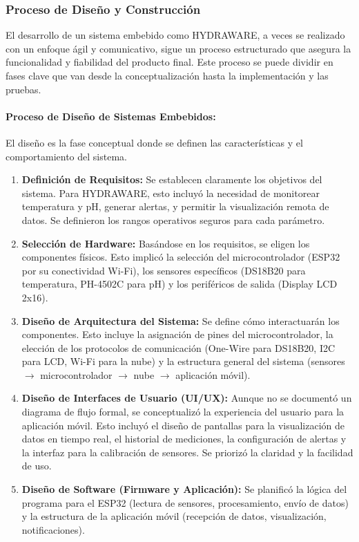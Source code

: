 \documentclass[a4paper,12pt]{article}
\begin{document}
	\subsubsection{Proceso de Diseño y Construcción}
	El desarrollo de un sistema embebido como HYDRAWARE, a veces se realizado con un enfoque ágil y comunicativo, sigue un proceso estructurado que asegura la funcionalidad y fiabilidad del producto final. Este proceso se puede dividir en fases clave que van desde la conceptualización hasta la implementación y las pruebas.
	
	\paragraph{Proceso de Diseño de Sistemas Embebidos:}
	El diseño es la fase conceptual donde se definen las características y el comportamiento del sistema.
	\begin{enumerate}
		\item \textbf{Definición de Requisitos:} Se establecen claramente los objetivos del sistema. Para HYDRAWARE, esto incluyó la necesidad de monitorear temperatura y pH, generar alertas, y permitir la visualización remota de datos. Se definieron los rangos operativos seguros para cada parámetro.
		\item \textbf{Selección de Hardware:} Basándose en los requisitos, se eligen los componentes físicos. Esto implicó la selección del microcontrolador (ESP32 por su conectividad Wi-Fi), los sensores específicos (DS18B20 para temperatura, PH-4502C para pH) y los periféricos de salida (Display LCD 2x16).
		\item \textbf{Diseño de Arquitectura del Sistema:} Se define cómo interactuarán los componentes. Esto incluye la asignación de pines del microcontrolador, la elección de los protocolos de comunicación (One-Wire para DS18B20, I2C para LCD, Wi-Fi para la nube) y la estructura general del sistema (sensores $\rightarrow$ microcontrolador $\rightarrow$ nube $\rightarrow$ aplicación móvil).
		\item \textbf{Diseño de Interfaces de Usuario (UI/UX):} Aunque no se documentó un diagrama de flujo formal, se conceptualizó la experiencia del usuario para la aplicación móvil. Esto incluyó el diseño de pantallas para la visualización de datos en tiempo real, el historial de mediciones, la configuración de alertas y la interfaz para la calibración de sensores. Se priorizó la claridad y la facilidad de uso.
		\item \textbf{Diseño de Software (Firmware y Aplicación):} Se planificó la lógica del programa para el ESP32 (lectura de sensores, procesamiento, envío de datos) y la estructura de la aplicación móvil (recepción de datos, visualización, notificaciones).
	\end{enumerate}
	
\end{document}
